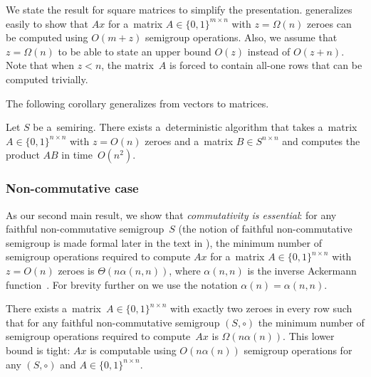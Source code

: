 \documentclass{toc}
\begin{document}
%
We state the result for square matrices to simplify the presentation.
 generalizes easily to show that $Ax$ for a~matrix
$A \in \{0,1\}^{m \times n}$ with $z=\Omega(n)$ zeroes can be computed using
$O(m+z)$ semigroup operations. Also, we assume that $z=\Omega(n)$ to be able to
state an upper bound $O(z)$ instead of $O(z+n)$. Note that when $z<n$, the
matrix~$A$ is forced to contain all-one rows that can be computed trivially.

The following corollary generalizes 
from vectors to matrices.

\begin{corollary}
\label{cor:matrixmultiplicationold}
Let $S$ be a~semiring. There exists a~deterministic algorithm that takes a~matrix
\linebreak${A \in \{0,1\}^{n \times n}}$ with $z=O(n)$ zeroes and a~matrix
$B \in S^{n \times n}$ and computes the product $AB$ in time~$O(n^2)$.
\end{corollary}

\subsubsection{Non-commutative case}


As our second main result, we show that \emph{commutativity is essential}: for
any faithful non-commutative semigroup~$S$
%
%
(the notion of faithful non-commutative semigroup  is made formal
later in the text in %
), %
the minimum number of semigroup operations
required to compute $Ax$ for a~matrix
$A \in \{0,1\}^{n \times n}$ with $z=O(n)$ zeroes is
%
$\Theta(n\alpha(n,n))$, where $\alpha(n,n)$ is the inverse Ackermann function~\cite{Tarjan75}.
For brevity further on we use the notation $\alpha(n) = \alpha(n,n)$. %
%
%
%

%
%
%
%

\begin{theorem}
\label{thm:lowerboundold}
There exists
a~matrix~$A \in \{0,1\}^{n \times n}$ with exactly two zeroes
in every row such that for any faithful non-commutative semigroup $(S, \circ)$
the minimum number of semigroup operations required to compute~$Ax$ is
$\Omega(n\alpha(n))$.
This lower bound is tight: $Ax$ is	computable using $O(n\alpha(n))$ semigroup
operations for any $(S, \circ)$ and $A\in \{0,1\}^{n \times n}$.
\end{theorem}

%
%
%
%
%
%
%
%
%
%
\end{document}
